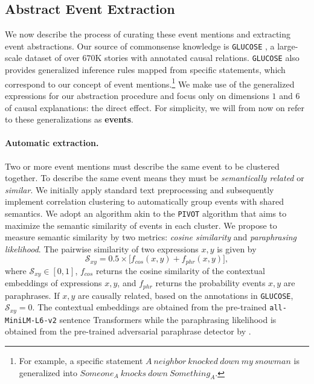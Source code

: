 \subsection{Abstract Event Extraction}\label{sec:abstraction}
We now describe the process of curating these event mentions and extracting event abstractions. Our source of commonsense knowledge is \texttt{GLUCOSE} \citep{mostafazadeh-etal-2020-glucose}, a large-scale dataset of over $670$K stories with annotated causal relations. \texttt{GLUCOSE} also provides generalized inference rules mapped from specific statements, which correspond to our concept of event mentions.\footnote{For example, a specific statement $A \ neighbor \ knocked \ down \ my \ snowman$  is generalized into $Someone_{A} \ knocks \ down \ Something_{A}$.} We make use of the generalized expressions for our abstraction procedure and focus only on dimensions $1$ and $6$ of causal explanations: the direct effect. For simplicity, we will from now on refer to these generalizations as \textbf{events}. 

\paragraph{Automatic extraction.} Two or more event mentions must describe the same event to be clustered together. To describe the same event means they must be \textit{semantically related} or \textit{similar}. We initially apply standard text preprocessing and subsequently implement correlation clustering \citep{bansal2004correlation,charikar2005clustering} to automatically group events with shared semantics. We adopt an algorithm akin to the \texttt{PIVOT} algorithm \citep{fukunaga2019lp} that aims to maximize the semantic similarity of events in each cluster. We propose to measure semantic similarity by two metrics: \textit{cosine similarity} and \textit{paraphrasing likelihood}. The pairwise similarity of two expressions $x,y$ is given by
\begin{equation}\label{eq:sim}
   \mathcal{S}_{xy}= 0.5 \times \big[ f_{cos} (x, y) + f_{phr} (x, y)\big], 
\end{equation}
where $\mathcal{S}_{xy} \in [0,1]$, $f_{cos}$ returns the cosine similarity of the contextual embeddings of expressions $x,y$, and $f_{phr}$ returns the probability events $x,y$ are paraphrases. If $x,y$ are causally related, based on the annotations in \texttt{GLUCOSE},  $\mathcal{S}_{xy} = 0$. The contextual embeddings are obtained from the pre-trained \texttt{all-MiniLM-L6-v2} sentence Transformers \citep{reimers-2020-multilingual-sentence-bert} while the paraphrasing likelihood is obtained from the pre-trained adversarial paraphrase detector by \citet{nighojkar-licato-2021-improving}. 

